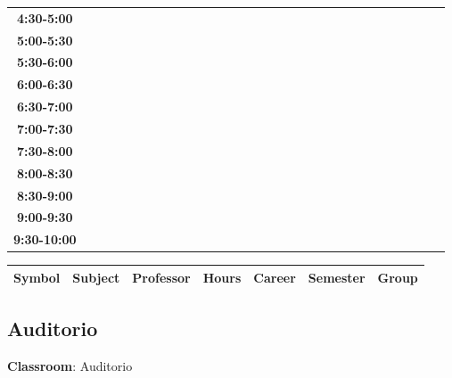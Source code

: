 \documentclass{article}
\begin{document}
\begin{table}[ht]
\begin{tabular}{|c|c|c|c|c|c|c|c|c|c|c|c|c|c|c|c|c|c|c|c|c|c|c|c|c|c|c|c|c|c|}
 \cline{1-8} 
\textbf{4:30-5:00} &   &   &   &   &   &   &   \\
 \cline{1-8} 
\textbf{5:00-5:30} &   &   &   &   &   &   &   \\
 \cline{1-8} 
\textbf{5:30-6:00} &   &   &   &   &   &   &   \\
 \cline{1-8} 
\textbf{6:00-6:30} &   &   &   &   &   &   &   \\
 \cline{1-8} 
\textbf{6:30-7:00} &   &   &   &   &   &   &   \\
 \cline{1-8} 
\textbf{7:00-7:30} &   &   &   &   &   &   &   \\
 \cline{1-8} 
\textbf{7:30-8:00} &   &   &   &   &   &   &   \\
 \cline{1-8} 
\textbf{8:00-8:30} &   &   &   &   &   &   &   \\
 \cline{1-8} 
\textbf{8:30-9:00} &   &   &   &   &   &   &   \\
 \cline{1-8} 
\textbf{9:00-9:30} &   &   &   &   &   &   &   \\
 \cline{1-8} 
\textbf{9:30-10:00} &   &   &   &   &   &   &   \\
 \cline{1-8} 
\end{tabular}\end{table}

        
        \begin{tabular}{|>{\centering\arraybackslash}m{2cm}|>{\centering\arraybackslash}m{4cm}|>{\centering\arraybackslash}m{2.15cm}|>{\centering\arraybackslash}m{1.8cm}|>{\centering\arraybackslash}m{2cm}|>{\centering\arraybackslash}m{2cm}|>{\centering\arraybackslash}m{2cm}|}
        \hline
        \textbf{Symbol} & \textbf{Subject} & \textbf{Professor} & \textbf{Hours} & \textbf{Career} & \textbf{Semester} & \textbf{Group} \\
        \hline
        \end{tabular}
                    

        \newpage
        

        \subsection{Auditorio}
        \vspace*{.1cm}
        
        \begin{flushright}
            {\LARGE \textbf{Classroom}: Auditorio}
        \end{flushright}
        \vspace{1cm}
\end{document}
